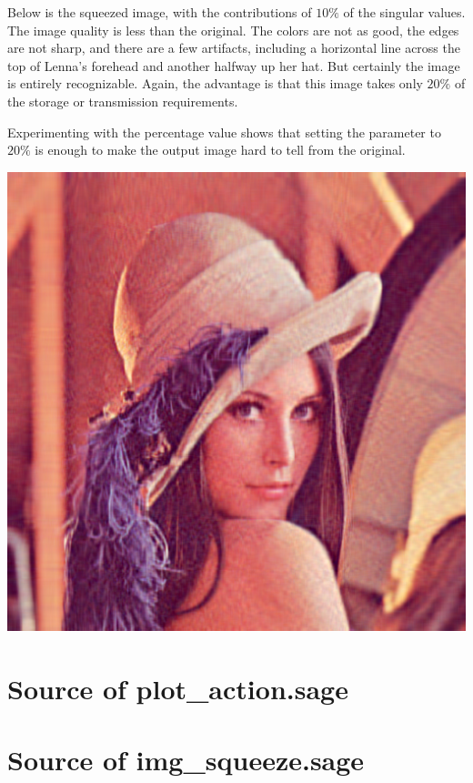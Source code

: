 Below is the squeezed image, with the contributions of
$10\%$ of the singular values.
The image quality is less than the 
original.
The colors are not as good, the edges are not sharp, and there are 
a few artifacts, including a horizontal line across the top of 
Lenna's forehead and another halfway up her hat.
But certainly the image is entirely recognizable.
Again, the advantage is that this image takes only $20\%$ of the storage
or transmission requirements.

Experimenting with the percentage value shows that setting
the parameter to $20\%$ is enough to make the output image hard to tell
from the original.

\begin{center}
  \includegraphics{Lena_squeezed.png}
\end{center}





\section{Source of plot\_action.sage}


\section{Source of img\_squeeze.sage}




\endinput


TODO:
1) mention Sage matrices are not mutable in matrix introduction.
Is mutable discussed in Intro?
